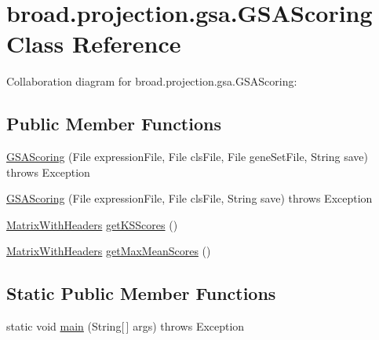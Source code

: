 \hypertarget{classbroad_1_1projection_1_1gsa_1_1_g_s_a_scoring}{\section{broad.\+projection.\+gsa.\+G\+S\+A\+Scoring Class Reference}
\label{classbroad_1_1projection_1_1gsa_1_1_g_s_a_scoring}
}


Collaboration diagram for broad.\+projection.\+gsa.\+G\+S\+A\+Scoring\+:
\subsection*{Public Member Functions}
\begin{DoxyCompactItemize}
\item 
\hyperlink{classbroad_1_1projection_1_1gsa_1_1_g_s_a_scoring_a511a11c0388f2886143c2c638bcd2bf8}{G\+S\+A\+Scoring} (File expression\+File, File cls\+File, File gene\+Set\+File, String save)  throws Exception
\item 
\hyperlink{classbroad_1_1projection_1_1gsa_1_1_g_s_a_scoring_a7f3b5933a9d8fd90ea13041aa5ea38c8}{G\+S\+A\+Scoring} (File expression\+File, File cls\+File, String save)  throws Exception
\item 
\hyperlink{classbroad_1_1core_1_1datastructures_1_1_matrix_with_headers}{Matrix\+With\+Headers} \hyperlink{classbroad_1_1projection_1_1gsa_1_1_g_s_a_scoring_a693da560ed5ecea8aa701c81295307ad}{get\+K\+S\+Scores} ()
\item 
\hyperlink{classbroad_1_1core_1_1datastructures_1_1_matrix_with_headers}{Matrix\+With\+Headers} \hyperlink{classbroad_1_1projection_1_1gsa_1_1_g_s_a_scoring_a26f38757a8e66dcdb37549ff5fffb598}{get\+Max\+Mean\+Scores} ()
\end{DoxyCompactItemize}
\subsection*{Static Public Member Functions}
\begin{DoxyCompactItemize}
\item 
static void \hyperlink{classbroad_1_1projection_1_1gsa_1_1_g_s_a_scoring_ab594d2e7623ddae67ec238958dc8d067}{main} (String\mbox{[}$\,$\mbox{]} args)  throws Exception
\end{DoxyCompactItemize}


